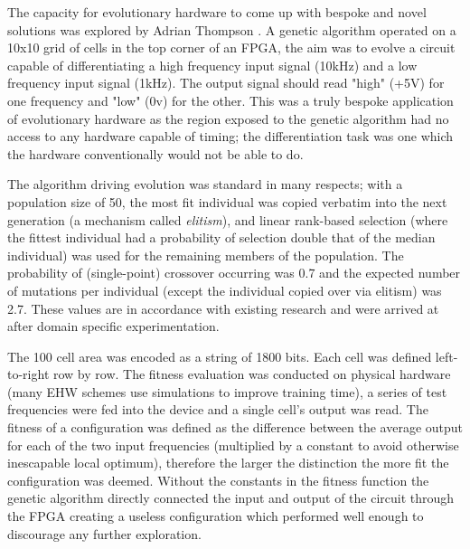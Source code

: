 The capacity for evolutionary hardware to come up with bespoke and novel solutions
was explored by Adrian Thompson \cite{10.1007/3-540-63173-9_61}. A genetic algorithm
operated on a 10x10 grid of cells in the top corner of an FPGA, the aim was to evolve
a circuit capable of differentiating a high frequency input signal (10kHz) and a
low frequency input signal (1kHz). The output signal should read "high" (+5V) for one frequency
and "low" (0v) for the other. This was a truly bespoke application of evolutionary
hardware as the region exposed to the genetic algorithm had no access to any
hardware capable of timing; the differentiation task was one which the hardware
conventionally would not be able to do.

The algorithm driving evolution was standard in many respects; with a population size of 50,
the most fit individual was copied verbatim into the next generation (a mechanism
called {\em elitism}), and linear rank-based selection (where the fittest
individual had a probability of selection double that of the median individual)
was used for the remaining members of the population. The probability of (single-point)
crossover occurring was 0.7 and the expected number of mutations per individual
(except the individual copied over via elitism) was 2.7. These values are in
accordance with existing research and were arrived at after domain specific
experimentation.

The 100 cell area was encoded as a string of 1800 bits. Each cell was defined
left-to-right row by row. The fitness evaluation was conducted on physical hardware
(many EHW schemes use simulations to improve training time), a series of test frequencies
were fed into the device and a single cell's output was read. The fitness of a configuration
was defined as the difference between the average output for each of the two input frequencies
(multiplied by a constant to avoid otherwise inescapable local optimum), therefore the larger
the distinction the more fit the configuration was deemed. Without the constants in the
fitness function the genetic algorithm directly connected the input and output of
the circuit through the FPGA creating a useless configuration which performed
well enough to discourage any further exploration.

